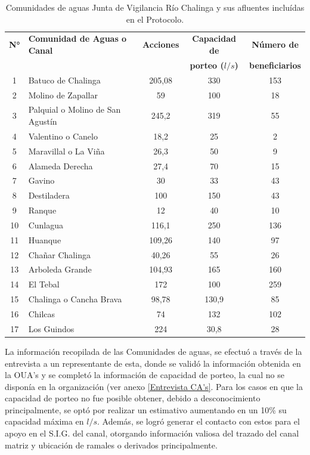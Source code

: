 \documentclass[]{article}
\begin{document}
\begin{table}[H]
\centering
\caption{Comunidades de aguas Junta de Vigilancia Río Chalinga y sus afluentes incluídas en el Protocolo.}
\label{priorización1}
	\begin{tabular}{|c|l|c|c|c|}
	\hline
	\textbf{N°} & \textbf{Comunidad de Aguas o Canal} & \textbf{Acciones} & \textbf{Capacidad de} & \textbf{Número de} \\
	& & & \textbf{porteo ($l/s$)} & \textbf{beneficiarios} \\ \hline
	1 & Batuco de Chalinga 					& 205,08 & 330 	 & 153	\\ \hline
	2 & Molino de Zapallar 					& 59 	 & 100 	 & 18 	\\ \hline
	3 & Palquial o Molino de San Agustín	& 245,2	 & 319 	 & 55 	\\ \hline
	4 & Valentino o Canelo					& 18,2 	 & 25	 & 2 	\\ \hline
	5 & Maravillal o La Viña				& 26,3	 & 50	 & 9 	\\ \hline
	6 & Alameda Derecha						& 27,4	 & 70 	 & 15 	\\ \hline
	7 & Gavino								& 30	 & 33 	 & 43 	\\ \hline
	8 & Destiladera							& 100 	 & 150 	 & 43 	\\ \hline
	9 & Ranque								& 12 	 & 40 	 & 10 	\\ \hline
	10 & Cunlagua							& 116,1	 & 250 	 & 136 	\\ \hline
	11 & Huanque							& 109,26 & 140 	 & 97 	\\ \hline
	12 & Chañar	Chalinga					& 40,26	 & 55	 & 26 	\\ \hline
	13 & Arboleda Grande					& 104,93 & 165 	 & 160 	\\ \hline
	14 & El Tebal							& 172 	 & 100	 & 259 	\\ \hline
	15 & Chalinga o Cancha Brava			& 98,78	 & 130,9 & 85 	\\ \hline
	16 & Chilcas							& 74	 & 132 	 & 102 	\\ \hline
	17 & Los Guindos						& 224 	 & 30,8  & 28 	\\ \hline	
	\end{tabular}
\end{table}

La información recopilada de las Comunidades de aguas, se efectuó a través de la entrevista a un representante de esta, donde se validó la información obtenida en la OUA's y se completó la información de capacidad de porteo, la cual no se disponía en la organización (ver anexo \ref{Entrevista CA's}. Para los casos en que la capacidad de porteo no fue posible obtener, debido a desconocimiento principalmente, se optó por realizar un estimativo aumentando en un 10\% su capacidad máxima en $l/s$. Además, se logró generar el contacto con estos para el apoyo en el S.I.G. del canal, otorgando información valiosa del trazado del canal matriz y ubicación de ramales o derivados principalmente.
\end{document}
